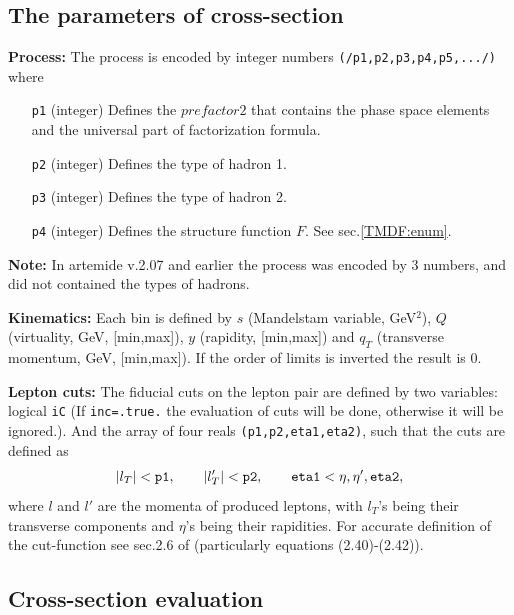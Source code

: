 \documentclass[prd,nofootinbib,eqsecnum,final]{revtex4}
\renewcommand{\(}{\left(}
\renewcommand{\)}{\right)}
\renewcommand{\[}{\left[}
\renewcommand{\]}{\right]}
\newcommand{\red}[1]{{\color[rgb]{1,0,0} #1}}
\begin{document}
\subsection{The parameters of cross-section}
\label{TMDX:setup}


\textbf{Process:} The process is encoded by integer numbers \texttt{(/p1,p2,p3,p4,p5,.../)} where
\begin{itemize}
\item[\texttt{p1}] (integer) Defines the $prefactor2$ that contains the phase space elements and the universal part of factorization formula. 
\item[\texttt{p2}] (integer) Defines the type of hadron 1.
\item[\texttt{p3}] (integer) Defines the type of hadron 2.
\item[\texttt{p4}] (integer) Defines the structure function $F$. See sec.\ref{TMDF:enum}. 
\end{itemize}
\textbf{Note:} \red{In artemide v.2.07 and earlier} the process was encoded by 3 numbers, and did not contained the types of hadrons.

\textbf{Kinematics:} Each bin is defined by $s$ (Mandelstam variable, GeV$^2$), $Q$ (virtuality, GeV, [min,max]), $y$ (rapidity, [min,max]) and $q_T$ (transverse momentum, GeV, [min,max]). If the order of limits is inverted the result is 0.

\textbf{Lepton cuts:} The fiducial cuts on the lepton pair are defined by two variables: logical \texttt{iC} (If \texttt{inc=.true.} the evaluation of cuts will be done, otherwise it will be ignored.). And the array of four reals \texttt{(p1,p2,eta1,eta2)}, such that the cuts are defined as
\begin{eqnarray}
|l_T|<\text{\texttt{p1}},\qquad |l'_T|<\text{\texttt{p2}},\qquad \text{\texttt{eta1}}<\eta,\eta',\text{\texttt{eta2}},
\end{eqnarray}
where $l$ and $l'$ are the momenta of produced leptons, with $l_T$'s being their transverse components and $\eta$'s being their rapidities. For accurate definition of the cut-function see sec.2.6 of \cite{Scimemi:2017etj} (particularly equations (2.40)-(2.42)).

\subsection{Cross-section evaluation}
\label{TMDX:xsec}
\end{document}
